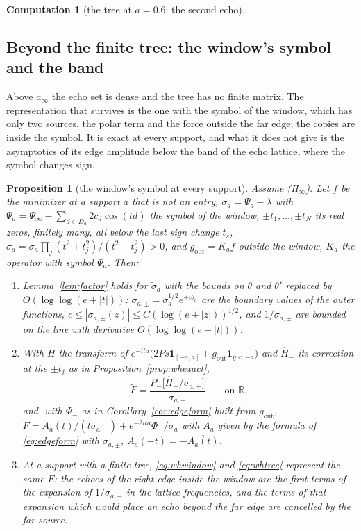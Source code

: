\documentclass[11pt]{article}
\newtheorem{proposition}[theorem]{Proposition}
\theoremstyle{definition}
\newtheorem{computation}[theorem]{Computation}
\theoremstyle{remark}
\newcommand{\R}{\mathbb{R}}
\begin{document}
\begin{computation}[the tree at $a=0.6$: the second echo]
\end{computation}


\subsection{Beyond the finite tree: the window's symbol and the band}\label{sec:band}

Above $a_\infty$ the echo set is dense and the tree has no finite matrix. The representation that survives is the one with the symbol of the window, which has only two sources, the polar term and the force outside the far edge; the copies are inside the symbol. It is exact at every support, and what it does not give is the asymptotics of its edge amplitude below the band of the echo lattice, where the symbol changes sign.

\begin{proposition}[the window's symbol at every support]\label{prop:window}
Assume (H$_\infty$). Let $f$ be the minimizer at a support $a$ that is not an entry, $\sigma_a=\Psi_a-\lambda$ with $\Psi_a=\Psi_\infty-\sum_{d\in D_a}2c_d\cos(td)$ the symbol of the window, $\pm t_1,\dots,\pm t_N$ its real zeros, finitely many, all below the last sign change $t_s$, $\tilde\sigma_a=\sigma_a\prod_j(t^2+t_j^2)/(t^2-t_j^2)>0$, and $g_{\mathrm{out}}=K_af$ outside the window, $K_a$ the operator with symbol $\Psi_a$. Then:
\begin{enumerate}
\item[(i)] Lemma~\ref{lem:factor} holds for $\tilde\sigma_a$ with the bounds on $\theta$ and $\theta'$ replaced by $O(\log\log(e+|t|))$: $\sigma_{a,\pm}=\tilde\sigma_a^{1/2}e^{\pm i\theta_a}$ are the boundary values of the outer functions, $c\le|\sigma_{a,\pm}(z)|\le C(\log(e+|z|))^{1/2}$, and $1/\sigma_{a,\pm}$ are bounded on the line with derivative $O(\log\log(e+|t|))$.
\item[(ii)] With $\tilde H$ the transform of $e^{-ita}\big(2Ps\mathbf 1_{[-a,a]}+g_{\mathrm{out}}\mathbf 1_{y<-a}\big)$ and $\hat H_-$ its correction at the $\pm t_j$ as in Proposition~\ref{prop:whexact},
\begin{equation}\label{eq:whwindow}
\tilde F=\frac{P_-\big[\hat H_-/\sigma_{a,+}\big]}{\sigma_{a,-}}\qquad\text{on }\R ,
\end{equation}
and, with $\Phi_-$ as in Corollary~\ref{cor:edgeform} built from $g_{\mathrm{out}}$, $\tilde F=A_a(t)/(t\sigma_{a,-})+e^{-2ita}\Phi_-/\tilde\sigma_a$ with $A_a$ given by the formula of \eqref{eq:edgeform} with $\sigma_{a,\pm}$, $A_a(-t)=-\overline{A_a(t)}$.
\item[(iii)] At a support with a finite tree, \eqref{eq:whwindow} and \eqref{eq:whtree} represent the same $\tilde F$: the echoes of the right edge inside the window are the first terms of the expansion of $1/\sigma_{a,-}$ in the lattice frequencies, and the terms of that expansion which would place an echo beyond the far edge are cancelled by the far source.
\end{enumerate}
\end{proposition}
\end{document}
